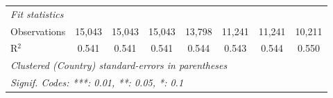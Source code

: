 \begin{tabular}{lccccccc}
   \midrule \emph{Fit statistics}\\
   Observations                                                                 & 15,043  & 15,043  & 15,043       & 13,798        & 11,241      & 11,241       & 10,211\\  
   R$^2$                                                                        & 0.541   & 0.541   & 0.541        & 0.544         & 0.543       & 0.544        & 0.550\\  
   \midrule
   \multicolumn{8}{l}{\emph{Clustered (Country) standard-errors in parentheses}}\\
   \multicolumn{8}{l}{\emph{Signif. Codes: ***: 0.01, **: 0.05, *: 0.1}}\\
\end{tabular}
\par\endgroup


